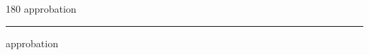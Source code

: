 
\begin{frame}
\begin{center}
\begin{turn}{180}
{\fontsize{2.5cm}{1em}\selectfont approbation}
\end{turn}
\vspace{1em}\par  
\hrule
\vspace{1em}\par  
{\fontsize{2.5cm}{1em}\selectfont approbation}
\end{center}
\end{frame}
